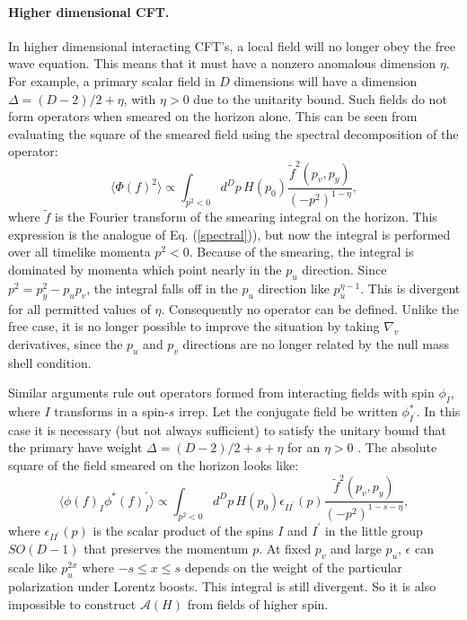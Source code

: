 \documentclass[12pt]{article}
\begin{document}
\paragraph{\textbf{Higher dimensional CFT.}}  In higher dimensional interacting CFT's, a local field will no longer obey the free wave equation.  This means that it must have a nonzero anomalous dimension $\eta$.  For example, a primary scalar field in $D$ dimensions will have a dimension $\Delta = (D - 2)/2 + \eta$, with $\eta > 0$ due to the unitarity bound.  Such fields do not form operators when smeared on the horizon alone.  This can be seen from evaluating the square of the smeared field using the spectral decomposition of the operator:
\begin{equation}
\langle \Phi(f)^2 \rangle \propto
\int_{p^2 < 0} d^{D}p\,H(p_0) \frac{\tilde{f}^2(p_v, p_y)}{(-p^2)^{1 - \eta}},
\end{equation}
where $\tilde{f}$ is the Fourier transform of the smearing integral on the horizon.  This expression is the analogue of Eq. (\ref{spectral})), but now the integral is performed over all timelike momenta $p^2 < 0$.  Because of the smearing, the integral is dominated by momenta which point nearly in the $p_u$ direction.  Since $p^2 = p_y^2 - p_u p_v$, the integral falls off in the $p_u$ direction like $p_u^{\eta - 1}$.  This is divergent for all permitted values of $\eta$.  Consequently no operator can be defined.  Unlike the free case, it is no longer possible to improve the situation by taking $\nabla_v$ derivatives, since the $p_u$ and $p_v$ directions are no longer related by the null mass shell condition.

Similar arguments rule out operators formed from interacting fields with spin $\phi_I$, where $I$ transforms in a spin-$s$ irrep.  Let the conjugate field be written $\phi^*_{I^\prime}$.  In this case it is necessary (but not always sufficient) to satisfy the unitary bound that the primary have weight $\Delta = (D - 2)/2 + s + \eta$ for an $\eta > 0$ \cite{mack}.  The absolute square of the field smeared on the horizon looks like:
\begin{equation}
\langle \phi(f)_I \phi^* (f)_I^\prime \rangle \propto
\int_{p^2 < 0} d^{D}p\,H(p_0) \epsilon_{II^\prime}(p)
\frac{\tilde{f}^2(p_v, p_y)}{(-p^2)^{1 - s - \eta}},
\end{equation}
where $\epsilon_{II^\prime}(p)$ is the scalar product of the spins $I$ and $I^\prime$ in the little group $SO(D - 1)$ that preserves the momentum $p$.  At fixed $p_v$ and large $p_u$, $\epsilon$ can scale like $p_u^{2x}$ where $-s \le x \le s$ depends on the weight of the particular polarization under Lorentz boosts.  This integral is still divergent.  So it is also impossible to construct $\mathcal{A}(H)$ from fields of higher spin.
\end{document}
